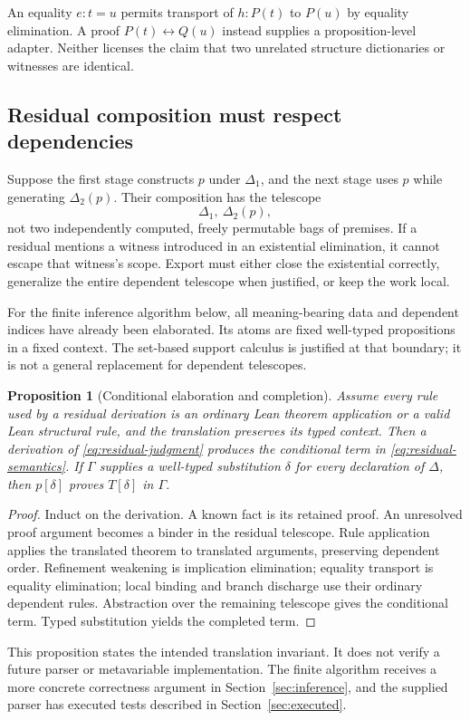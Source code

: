 \documentclass[11pt,a4paper]{article}
\theoremstyle{plain}
\newtheorem{proposition}[theorem]{Proposition}
\theoremstyle{definition}
\theoremstyle{remark}
\begin{document}
An equality $e:t=u$ permits transport of $h:P(t)$ to $P(u)$ by equality elimination. A proof $P(t)\leftrightarrow Q(u)$ instead supplies a proposition-level adapter. Neither licenses the claim that two unrelated structure dictionaries or witnesses are identical.

\subsection{Residual composition must respect dependencies}
Suppose the first stage constructs $p$ under $\Delta_1$, and the next stage uses $p$ while generating $\Delta_2(p)$. Their composition has the telescope
\[
 \Delta_1,\ \Delta_2(p),
\]
not two independently computed, freely permutable bags of premises. If a residual mentions a witness introduced in an existential elimination, it cannot escape that witness's scope. Export must either close the existential correctly, generalize the entire dependent telescope when justified, or keep the work local.

For the finite inference algorithm below, all meaning-bearing data and dependent indices have already been elaborated. Its atoms are fixed well-typed propositions in a fixed context. The set-based support calculus is justified at that boundary; it is not a general replacement for dependent telescopes.

\begin{proposition}[Conditional elaboration and completion]\label{prop:conditional}
Assume every rule used by a residual derivation is an ordinary Lean theorem application or a valid Lean structural rule, and the translation preserves its typed context. Then a derivation of \eqref{eq:residual-judgment} produces the conditional term in \eqref{eq:residual-semantics}. If $\Gamma$ supplies a well-typed substitution $\delta$ for every declaration of $\Delta$, then $p[\delta]$ proves $T[\delta]$ in $\Gamma$.
\end{proposition}
\begin{proof}
Induct on the derivation. A known fact is its retained proof. An unresolved proof argument becomes a binder in the residual telescope. Rule application applies the translated theorem to translated arguments, preserving dependent order. Refinement weakening is implication elimination; equality transport is equality elimination; local binding and branch discharge use their ordinary dependent rules. Abstraction over the remaining telescope gives the conditional term. Typed substitution yields the completed term.
\end{proof}
This proposition states the intended translation invariant. It does not verify a future parser or metavariable implementation. The finite algorithm receives a more concrete correctness argument in Section~\ref{sec:inference}, and the supplied parser has executed tests described in Section~\ref{sec:executed}.
\end{document}
